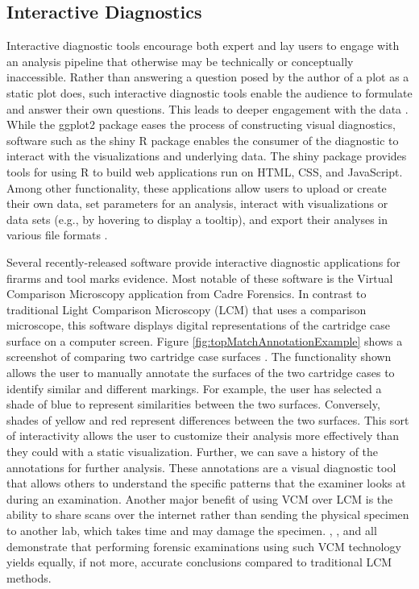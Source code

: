 \documentclass[11pt,]{isuthesis}
\begin{document}
\hypertarget{interactive-diagnostics}{%
\subsection{Interactive Diagnostics}\label{interactive-diagnostics}}

Interactive diagnostic tools encourage both expert and lay users to engage with an analysis pipeline that otherwise may be technically or conceptually inaccessible.
Rather than answering a question posed by the author of a plot as a static plot does, such interactive diagnostic tools enable the audience to formulate and answer their own questions.
This leads to deeper engagement with the data \citep{telea2014data}.
While the ggplot2 package eases the process of constructing visual diagnostics, software such as the shiny R package \citep{shiny} enables the consumer of the diagnostic to interact with the visualizations and underlying data.
The shiny package provides tools for using R to build web applications run on HTML, CSS, and JavaScript.
Among other functionality, these applications allow users to upload or create their own data, set parameters for an analysis, interact with visualizations or data sets (e.g., by hovering to display a tooltip), and export their analyses in various file formats \citep{Beeley2018-ci}.

Several recently-released software provide interactive diagnostic applications for firarms and tool marks evidence.
Most notable of these software is the Virtual Comparison Microscopy application from Cadre Forensics\texttrademark.
In contrast to traditional Light Comparison Microscopy (LCM) that uses a comparison microscope, this software displays digital representations of the cartridge case surface on a computer screen.
Figure \ref{fig:topMatchAnnotationExample} shows a screenshot of comparing two cartridge case surfaces \citep{Chapnick2020}.
The functionality shown allows the user to manually annotate the surfaces of the two cartridge cases to identify similar and different markings.
For example, the user has selected a shade of blue to represent similarities between the two surfaces.
Conversely, shades of yellow and red represent differences between the two surfaces.
This sort of interactivity allows the user to customize their analysis more effectively than they could with a static visualization.
Further, we can save a history of the annotations for further analysis.
These annotations are a visual diagnostic tool that allows others to understand the specific patterns that the examiner looks at during an examination.
Another major benefit of using VCM over LCM is the ability to share scans over the internet rather than sending the physical specimen to another lab, which takes time and may damage the specimen.
\citet{Duez2017}, \citet{Chapnick2020}, and \citet{Knowles2021} all demonstrate that performing forensic examinations using such VCM technology yields equally, if not more, accurate conclusions compared to traditional LCM methods.
\end{document}

